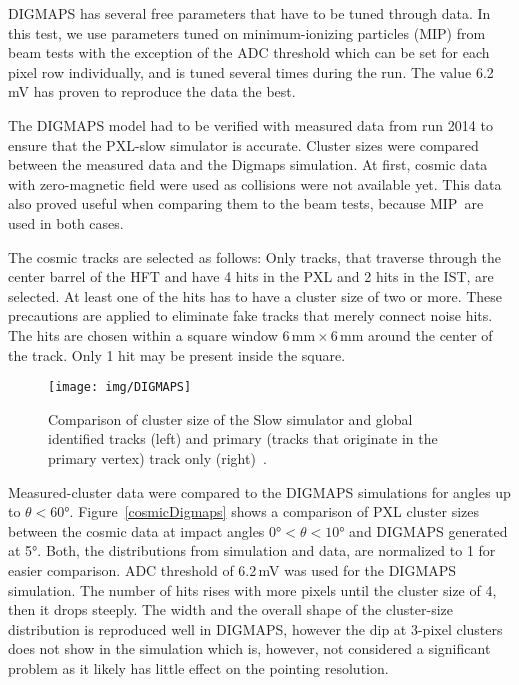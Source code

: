 DIGMAPS has several free parameters that have to be tuned through data. In this test, we use parameters tuned on minimum-ionizing particles (MIP) from beam tests with the exception of the ADC threshold which can be set for each pixel row individually, and is tuned several times during the run. The value 6.2$\,$mV has proven to reproduce the data the best.
 
The DIGMAPS model had to be verified with measured data from run 2014 to ensure that the PXL-slow simulator is accurate. Cluster sizes were compared between the measured data and the Digmaps simulation. At first, cosmic data with zero-magnetic field were used as collisions were not available yet. This data also proved useful when comparing them to the beam tests, because MIP\ are used in both cases.


The cosmic tracks are selected as follows: Only tracks, that traverse through the center barrel of the HFT and have 4 hits in the PXL and 2 hits in the IST, are selected. At least one of the hits has to have a cluster size of two or more. These precautions are applied to eliminate fake tracks that merely connect noise hits. The hits are chosen within a square window $6\,\mathrm{mm}\times6\,\mathrm{mm}$ around the center of the track. Only 1 hit may be present inside the square.

\begin{figure}[!tb]
\begin{center}
 \texttt{[image: img/DIGMAPS]}\\
\end{center}
\caption[Comparison of cluster size of the Slow simulator and global identified tracks and primary track only.]{\label{AuAuDigmaps}Comparison of cluster size of the Slow simulator and global identified tracks (left) and primary (tracks that originate in the primary vertex) track only
(right)~\cite{KubaVyzkumak}.}
\end{figure}


Measured-cluster data were compared to the DIGMAPS simulations for angles up to $\theta < 60$°. Figure~\ref{cosmicDigmaps} shows a comparison of PXL cluster sizes between the cosmic data at impact angles $0\text{°} < \theta < 10$° and DIGMAPS generated at 5°\@. Both, the distributions from simulation and data, are normalized to 1 for easier comparison.  ADC threshold of 6.2$\,$mV was used for the DIGMAPS simulation. The number of hits rises with more pixels until the cluster size of 4, then it drops steeply. The width and the overall shape of the cluster-size distribution is reproduced well in DIGMAPS, however the dip at 3-pixel clusters does not show in the simulation which is, however, not considered a significant problem as it likely has little effect on the pointing resolution.




